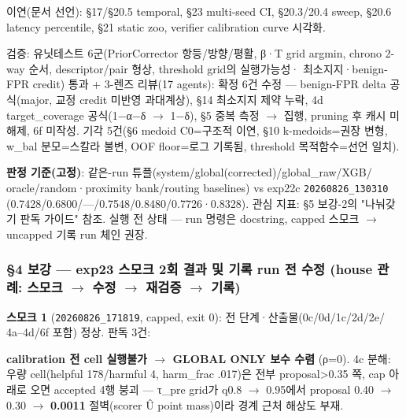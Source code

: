 이연(문서 선언): §17/\allowbreak{}§20.5 temporal, §23 multi-seed CI, §20.3/\allowbreak{}20.4 sweep, §20.6 latency percentile, §21 static zoo, verifier calibration curve 시각화.

검증: 유닛테스트 6군(PriorCorrector 항등/\allowbreak{}방향/\allowbreak{}평활, β·T grid argmin, chrono 2-way 순서, descriptor/\allowbreak{}pair 형상, threshold grid의 실행가능성· 최소지지·benign-FPR credit) 통과 +\allowbreak{} 3-렌즈 리뷰(17 agents): 확정 6건 수정 — benign-FPR delta 공식(major, 교정 credit 미반영 과대계상), §14 최소지지 제약 누락, 4d target\_\allowbreak{}coverage 공식(1−α−δ \ensuremath{\rightarrow} 1−δ), §5 중복 측정 \ensuremath{\rightarrow} 집행, pruning 후 캐시 미해제, 6f 미작성. 기각 5건(§6 medoid C0=\allowbreak{}구조적 이연, §10 k-medoids=\allowbreak{}권장 변형, w\_\allowbreak{}bal 분모=\allowbreak{}스칼라 불변, OOF floor=\allowbreak{}로그 기록됨, threshold 목적함수=\allowbreak{}선언 일치).

\textbf{판정 기준(고정)}: 같은-run 튜플(system/\allowbreak{}global(corrected)/\allowbreak{}global\_\allowbreak{}raw/\allowbreak{}XGB/\allowbreak{} oracle/\allowbreak{}random·proximity bank/\allowbreak{}routing baselines) vs exp22c \texttt{20260826\allowbreak{}\_\allowbreak{}\allowbreak{}130310} (0.7428/\allowbreak{}0.6800/\allowbreak{}—/\allowbreak{}0.7548/\allowbreak{}0.8480/\allowbreak{}0.7726·0.8328). 관심 지표: §5 보강-2의 "나눠갖기 판독 가이드" 참조. 실행 전 상태 — run 명령은 docstring, capped 스모크  \ensuremath{\rightarrow}  uncapped 기록 run 체인 권장.

\subsubsection{§4 보강 — exp23 스모크 2회 결과 및 기록 run 전 수정 (house 관례: 스모크 \ensuremath{\rightarrow} 수정 \ensuremath{\rightarrow} 재검증 \ensuremath{\rightarrow} 기록)}
\textbf{스모크 1} (\texttt{20260826\allowbreak{}\_\allowbreak{}\allowbreak{}171819}, capped, exit 0): 전 단계·산출물(0c/\allowbreak{}0d/\allowbreak{}1c/\allowbreak{}2d/\allowbreak{}2e/\allowbreak{} 4a–4d/\allowbreak{}6f 포함) 정상. 판독 3건:

\par\noindent \textbullet\enspace \textbf{calibration 전 cell 실행불가  \ensuremath{\rightarrow}  GLOBAL ONLY 보수 수렴} (ρ=\allowbreak{}0). 4c 분해: 우량 cell(helpful 178/\allowbreak{}harmful 4, harm\_\allowbreak{}frac .017)은 전부 proposal>0.35 쪽, cap 아래로 오면 accepted 4행 붕괴 — τ\_\allowbreak{}pre grid가 q0.8 \ensuremath{\rightarrow} 0.95에서 proposal 0.40 \ensuremath{\rightarrow} 0.30 \ensuremath{\rightarrow} \textbf{0.0011} 절벽(scorer Û point mass)이라 경계 근처 해상도 부재.


